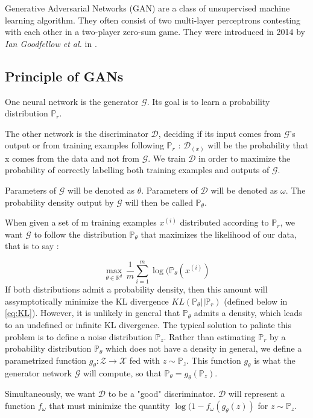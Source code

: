 \documentclass[a4paper]{article}
\newcommand{\G}{\mathcal{G}}
\newcommand{\D}{\mathcal{D}}
\newcommand{\X}{\mathcal{X}}
\newcommand{\Prob}{\mathbb{P}}
\newcommand{\real}{\mathbb{R}}
\theoremstyle{plain}
\theoremstyle{remark}
\theoremstyle{definition}
\begin{document}
Generative Adversarial Networks (GAN) are a class of unsupervised machine learning algorithm. They often consist of two multi-layer perceptrons contesting with each other in a two-player zero-sum game. They were introduced in 2014 by \textit{Ian Goodfellow et al.} in \cite{goodfellow2014generative}.

\subsection{Principle of GANs}

One neural network is the generator $\G$. Its goal is to learn a probability distribution $\Prob_r$.

The other network is the discriminator $\D$, deciding if its input comes from $\G$'s output or from training examples following $\Prob_r$ : $\D_(x)$ will be the probability that x comes from the data and not from $\G$. We train $\D$ in order to maximize the probability of correctly labelling both training examples and outputs of $\G$.

Parameters of $\G$ will be denoted as $\theta$. Parameters of $\D$ will be denoted as $\omega$.
The probability density output by $\G$ will then be called $\Prob_\theta$.

When given a set of m training examples ${x^{(i)}}$ distributed according to $\Prob_r$, we want $\G$ to follow the distribution $\Prob_{\theta}$ that maximizes the likelihood of our data, that is to say :

\begin{equation}
\label{eq:orig_problem}
\max_{\theta \in \real^d} \, \frac{1}{m} \sum_{i=1}^{m}{\log( \Prob_{\theta}(x^{(i)})}
\end{equation}
If both distributions admit a probability density, then this amount will assymptotically minimize the KL divergence $KL( \Prob_{\theta} || \Prob_r)$ (defined below in \ref{eq:KL}). However, it is unlikely in general that $\Prob_\theta$ admits a density, which leads to an undefined or infinite KL divergence. The typical solution to paliate this problem is to define a noise distribution $\Prob_z$. Rather than estimating $\Prob_r$ by a probability distribution $\Prob_{\theta}$ which does not have a density in general, we define a parametrized function $g_{\theta} : \mathcal{Z} \rightarrow \X$ fed with $ z \sim \Prob_z$. This function $g_{\theta}$ is what the generator network $\G$ will compute, so that $\Prob_\theta = g_\theta(\Prob_z)$.

Simultaneously, we want $\D$ to be a "good" discriminator. $\D$ will represent a function $f_\omega$ that must minimize the quantity $\log(1-f_{\omega}( g_{\theta}(z))$ for $z \sim \Prob_z$. 
\end{document}
